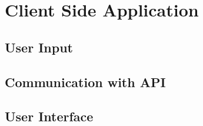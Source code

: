 \section{Client Side Application}



\subsection{User Input}


\subsection{Communication with API}


\subsection{User Interface}
